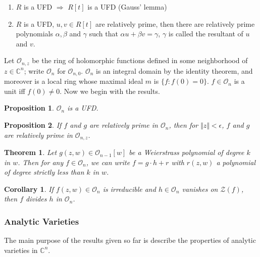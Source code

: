 \documentclass{article}
\newtheorem{thm}{Theorem}
\newtheorem{prop}{Proposition}
\newtheorem{cor}{Corollary}
\begin{document}
\begin{enumerate}
	\item $R$ is a UFD $\Rightarrow$ $R[t]$ is a UFD (Gauss' lemma)
	\item $R$ is a UFD, $u,v \in R[t]$ are relatively prime, then there are relatively prime polynomials $\alpha, \beta$ and $\gamma$ such that $\alpha u + \beta v = \gamma$, $\gamma$ is called the resultant of $u$ and $v$.
\end{enumerate}

Let $ \mathcal{O}_{n,z}$ be the ring of holomorphic functions defined in some neighborhood of $z \in \mathbb{C}^n$; write $\mathcal{O}_n$ for $\mathcal{O}_{n,0}$. $ \mathcal{ O }_n$ is an integral domain by the identity theorem, and moreover is a local ring whose maximal ideal $m$ is $ \{ f: f(0)=0 \} $. $f \in \mathcal{ O }_n$ is a unit iff $f(0) \neq 0$. Now we begin with the results.


\begin{prop}

$ \mathcal{ O }_n$ is a UFD.

\end{prop}


\begin{prop}

	If $f$ and $g$ are relatively prime in $ \mathcal{ O }_n$, then for $ \Vert z \Vert < \epsilon$, $f$ and $g$ are relatively prime in $ \mathcal{ O }_{n,z}$.

\end{prop}


\begin{thm}

	Let $g(z,w) \in \mathcal{ O }_{n-1}[w]$ be a Weierstrass polynomial of degree $k$ in $w$. Then for any $f \in \mathcal{ O }_n$, we can write $f = g \cdot h + r$ with $r(z,w)$ a polynomial of degree strictly less than $k$ in $w$.

\end{thm}


\begin{cor}

	If $f(z,w) \in \mathcal{ O }_n$ is irreducible and $h \in \mathcal{ O }_n$ vanishes on $ \mathcal{Z}(f)$, then $f$ divides $h$ in $ \mathcal{ O }_n$.

\end{cor}

\subsubsection{Analytic Varieties}
\indent The main purpose of the results given so far is describe the properties of analytic varieties in $ \mathbb{C}^n$.
\end{document}
